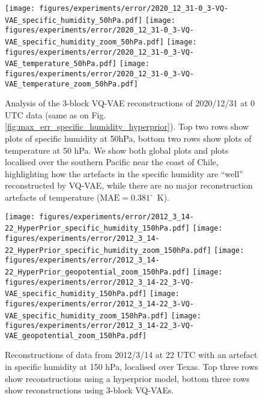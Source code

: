 \begin{figure}
    \centering
    \texttt{[image: figures/experiments/error/2020\_12\_31-0\_3-VQ-VAE\_specific\_humidity\_50hPa.pdf]}
    \texttt{[image: figures/experiments/error/2020\_12\_31-0\_3-VQ-VAE\_specific\_humidity\_zoom\_50hPa.pdf]}
    \texttt{[image: figures/experiments/error/2020\_12\_31-0\_3-VQ-VAE\_temperature\_50hPa.pdf]}
    \texttt{[image: figures/experiments/error/2020\_12\_31-0\_3-VQ-VAE\_temperature\_zoom\_50hPa.pdf]}
    \hfill
    \caption{Analysis of the 3-block VQ-VAE reconstructions of 2020/12/31 at 0 UTC data (same as on Fig. \ref{fig:max_err_specific_humidity_hyperprior}). Top two rows show plots of specific humidity at 50hPa, bottom two rows show plots of temperature at 50 hPa. We show both global plots and plots localised over the southern Pacific near the coast of Chile, highlighting how the artefacts in the specific humidity are ``well'' reconstructed by VQ-VAE, while there are no major reconstruction artefacts of temperature ($\text{MAE}=0.381^\circ$~K).}
    \label{fig:max_err_specific_humidity_vqvae}
\end{figure}

\begin{figure}
    \centering
    \texttt{[image: figures/experiments/error/2012\_3\_14-22\_HyperPrior\_specific\_humidity\_150hPa.pdf]}
    \texttt{[image: figures/experiments/error/2012\_3\_14-22\_HyperPrior\_specific\_humidity\_zoom\_150hPa.pdf]}
    \texttt{[image: figures/experiments/error/2012\_3\_14-22\_HyperPrior\_geopotential\_zoom\_150hPa.pdf]}
    \texttt{[image: figures/experiments/error/2012\_3\_14-22\_3-VQ-VAE\_specific\_humidity\_150hPa.pdf]}
    \texttt{[image: figures/experiments/error/2012\_3\_14-22\_3-VQ-VAE\_specific\_humidity\_zoom\_150hPa.pdf]}
    \texttt{[image: figures/experiments/error/2012\_3\_14-22\_3-VQ-VAE\_geopotential\_zoom\_150hPa.pdf]}
    \hfill
    \caption{Reconstructions of data from 2012/3/14 at 22 UTC with an artefact in specific humidity at 150 hPa, localised over Texas. Top three rows show reconstructions using a hyperprior model, bottom three rows show reconstructions using 3-block VQ-VAEs.}
    \label{fig:max_err_specific_humidity_alt}
\end{figure}
